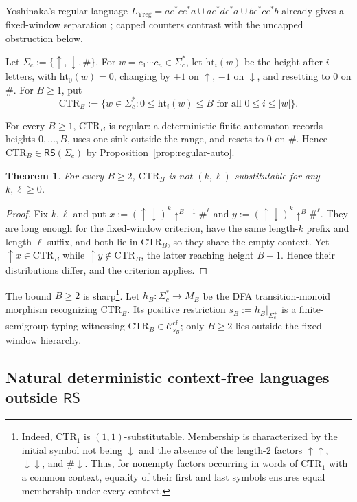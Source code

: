 \documentclass[11pt,a4paper]{article}
\newtheorem{theorem}{Theorem}[section]
\theoremstyle{remark}
\theoremstyle{plain}
\newcommand{\cf}{\mathrm{cf}}
\newcommand{\Ccf}[1]{\mathcal C_{#1}^{\cf}}
\begin{document}
Yoshinaka's regular language
$L_{\mathrm{Yreg}}=ae^*ce^*a\cup ae^*de^*a\cup be^*ce^*b$
already gives a fixed-window separation
\cite[Proposition~1]{yoshinaka2008}; capped counters contrast
with the uncapped obstruction below.

Let $\Sigma_c:=\{\uparrow,\downarrow,\#\}$.  For
$w=c_1\cdots c_n\in\Sigma_c^*$, let $\mathrm{ht}_i(w)$
be the height after $i$ letters, with $\mathrm{ht}_0(w)=0$, changing
by $+1$ on $\uparrow$, $-1$ on $\downarrow$, and resetting to $0$ on $\#$.
For $B\ge1$, put
\[
\mathrm{CTR}_B:=
\{w\in\Sigma_c^*:0\le\mathrm{ht}_i(w)\le B
\text{ for all }0\le i\le|w|\}.
\]

For every $B\ge1$, $\mathrm{CTR}_B$ is regular: a deterministic
finite automaton records
heights $0,\ldots,B$, uses one sink outside the range, and resets to $0$
on $\#$.  Hence $\mathrm{CTR}_B\in\mathsf{RS}(\Sigma_c)$ by
Proposition~\ref{prop:regular-auto}.

\begin{theorem}\label{thm:ctr-non-kl}
For every $B\ge2$, $\mathrm{CTR}_B$ is not
$(k,\ell)$-substitutable for any $k,\ell\ge0$.
\end{theorem}
\begin{proof}
Fix $k,\ell$ and put
$x:=(\uparrow\downarrow)^k\uparrow^{B-1}\#^\ell$ and
$y:=(\uparrow\downarrow)^k\uparrow^B\#^\ell$.  They are long
enough for the fixed-window criterion, have the same length-$k$ prefix and
length-$\ell$ suffix, and both lie in $\mathrm{CTR}_B$,
so they share the empty context. Yet
$\uparrow x\in\mathrm{CTR}_B$ while
$\uparrow y\notin\mathrm{CTR}_B$, the latter reaching height
$B+1$.  Hence their distributions differ, and the criterion applies.
\end{proof}

The bound $B\ge2$ is sharp\footnote{Indeed,
$\mathrm{CTR}_1$ is $(1,1)$-substitutable. Membership is characterized
by the initial symbol not being $\downarrow$ and the absence
of the length-$2$ factors $\uparrow\uparrow$,
$\downarrow\downarrow$, and $\#\downarrow$. Thus, for nonempty factors occurring in words of $\mathrm{CTR}_1$
with a common context, equality of their first and last symbols
ensures equal membership under every context.}.
Let $h_B:\Sigma_c^*\to M_B$ be the
DFA transition-monoid morphism recognizing
$\mathrm{CTR}_B$. Its positive restriction
$s_B:=h_B|_{\Sigma_c^+}$ is a finite-semigroup
typing witnessing $\mathrm{CTR}_B\in\Ccf{s_B}$;
only $B\ge2$ lies outside the fixed-window hierarchy.

\subsection{Natural deterministic context-free languages outside \texorpdfstring{$\mathsf{RS}$}{RS}}\label{sec:outside-rs}
\end{document}
